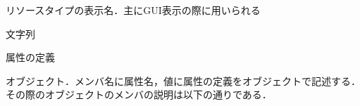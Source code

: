 \begin{description}
{\nopagebreak
\item[\texttt{DisplayName}] \mbox{}
    \vspace{-1zw}
    \begin{description}
    \setlength{\itemsep}{-1.5\itemsep}
    \item[説明] リソースタイプの表示名．主にGUI表示の際に用いられる
    \item[値] 文字列
    \end{description}
}
\clearpage
\item[\texttt{Attributes}] \mbox{}
    \vspace{-1zw}
    \begin{description}
    \setlength{\itemsep}{-1.5\itemsep}
    \item[説明] 属性の定義
    \item[値] オブジェクト．メンバ名に属性名，値に属性の定義をオブジェクトで記述する．その際のオブジェクトのメンバの説明は以下の通りである．
    

\end{description}
\end{description}
